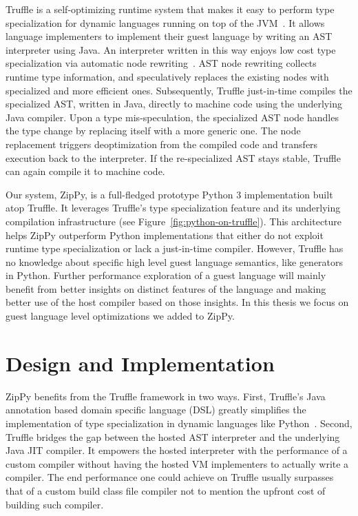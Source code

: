 Truffle is a self-optimizing runtime system that makes it easy to perform type specialization for dynamic languages running on top of the JVM~\cite{Wurthinger+13}.
It allows language implementers to implement their guest language by writing an AST interpreter using Java.
An interpreter written in this way enjoys low cost type specialization via automatic node rewriting~\cite{Wurthinger+12,Brunthaler2010inca,Brunthaler2010quickening}.
AST node rewriting collects runtime type information, and speculatively replaces the existing nodes with specialized and more efficient ones.
Subsequently, Truffle just-in-time compiles the specialized AST, written in Java, directly to machine code using the underlying Java compiler.
Upon a type mis-speculation, the specialized AST node handles the type change by replacing itself with a more generic one.
The node replacement triggers deoptimization from the compiled code and transfers execution back to the interpreter.
If the re-specialized AST stays stable, Truffle can again compile it to machine code.

Our system, ZipPy, is a full-fledged prototype Python 3 implementation built atop Truffle.
It leverages Truffle's type specialization feature and its underlying compilation infrastructure (see Figure~\ref{fig:python-on-truffle}).
This architecture helps ZipPy outperform Python implementations that either do not exploit runtime type specialization or lack a just-in-time compiler.
However, Truffle has no knowledge about specific high level guest language semantics, like generators in Python.
Further performance exploration of a guest language will mainly benefit from better insights on distinct features of the language and
making better use of the host compiler based on those insights.
In this thesis we focus on guest language level optimizations we added to ZipPy.

\section{Design and Implementation}
\label{sec:ch3-design-and-implementation}

ZipPy benefits from the Truffle framework in two ways.
First, Truffle's Java annotation based domain specific language (DSL) greatly simplifies the implementation of type specialization in dynamic languages like Python~\cite{Humer+2014}.
Second, Truffle bridges the gap between the hosted AST interpreter and the underlying Java JIT compiler.
It empowers the hosted interpreter with the performance of a custom compiler without having the hosted VM implementers to actually write a compiler.
The end performance one could achieve on Truffle usually surpasses that of a custom build class file compiler not to mention the upfront cost of building such compiler.

